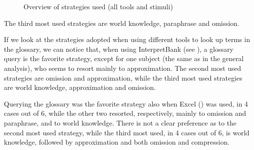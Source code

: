 \documentclass[output=paper]{langsci/langscibook}
\begin{document}
\begin{figure}
\caption{Overview of strategies used (all tools and stimuli)} \label{fig:prandi:15}
\end{figure}

The third most used strategies are world knowledge, paraphrase and omission.

If we look at the strategies adopted when using different tools to look up terms in the glossary, we can notice that, when using InterpretBank (see ), a glossary query is the favorite strategy, except for one subject (the same as in the general analysis), who seems to resort mainly to approximation. The second most used strategies are omission and approximation, while the third most used strategies are world knowledge, approximation and omission.

Querying the glossary was the favorite strategy also when Excel () was used, in 4 cases out of 6, while the other two resorted, respectively, mainly to omission and paraphrase, and to world knowledge. There is not a clear preference as to the second most used strategy, while the third most used, in 4 cases out of 6, is world knowledge, followed by approximation and both omission and compression.
\end{document}
